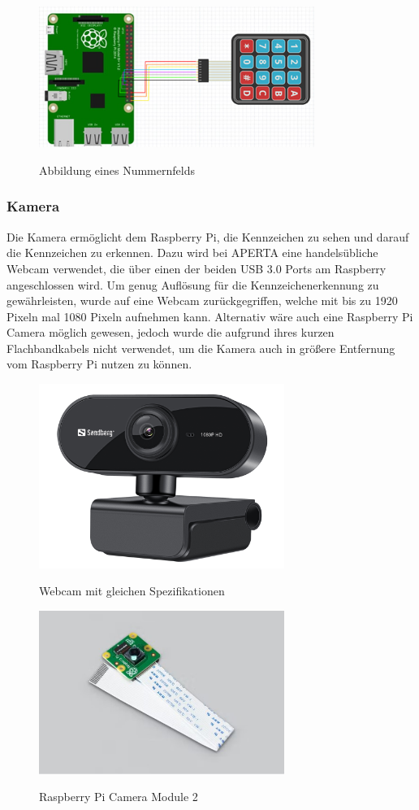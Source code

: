 \begin{figure}[h]
  \centering
  \includegraphics[width=0.8\textwidth]{pics/Nummerfeld.png}
  \caption{Abbildung eines Nummernfelds}
  \cite{Nummernfeld}
\end{figure}

\subsubsection{Kamera}
Die Kamera ermöglicht dem Raspberry Pi, die Kennzeichen zu sehen und darauf die Kennzeichen zu erkennen. Dazu wird bei APERTA eine handelsübliche Webcam verwendet, die über einen der beiden USB 3.0 Ports am Raspberry angeschlossen wird.
Um genug Auflösung für die Kennzeichenerkennung zu gewährleisten, wurde auf eine Webcam zurückgegriffen, welche mit bis zu 1920 Pixeln mal 1080 Pixeln aufnehmen kann.
Alternativ wäre auch eine Raspberry Pi Camera möglich gewesen, jedoch wurde die aufgrund ihres kurzen Flachbandkabels nicht verwendet, um die Kamera auch in größere Entfernung vom Raspberry Pi nutzen zu können.
\begin{figure}[H]
  \centering
  \includegraphics[width=8cm]{pics/Webcam.jpg}
  \caption{Webcam mit gleichen Spezifikationen}
  \cite{Webcam}
\end{figure}

\begin{figure}[H]
  \centering
  \includegraphics[width=8cm]{pics/RaspberryPiCameraModule2.jpg}
  \caption{Raspberry Pi Camera Module 2}
  \cite{PiCamera}
\end{figure}

